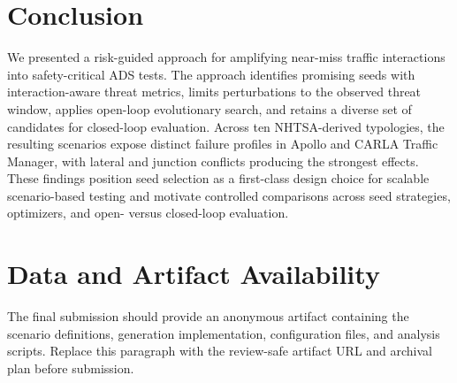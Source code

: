\section{Conclusion}

We presented a risk-guided approach for amplifying near-miss traffic interactions into safety-critical ADS tests. The approach identifies promising seeds with interaction-aware threat metrics, limits perturbations to the observed threat window, applies open-loop evolutionary search, and retains a diverse set of candidates for closed-loop evaluation. Across ten NHTSA-derived typologies, the resulting scenarios expose distinct failure profiles in Apollo and CARLA Traffic Manager, with lateral and junction conflicts producing the strongest effects. These findings position seed selection as a first-class design choice for scalable scenario-based testing and motivate controlled comparisons across seed strategies, optimizers, and open- versus closed-loop evaluation.

\section{Data and Artifact Availability}

The final submission should provide an anonymous artifact containing the scenario definitions, generation implementation, configuration files, and analysis scripts. Replace this paragraph with the review-safe artifact URL and archival plan before submission.
